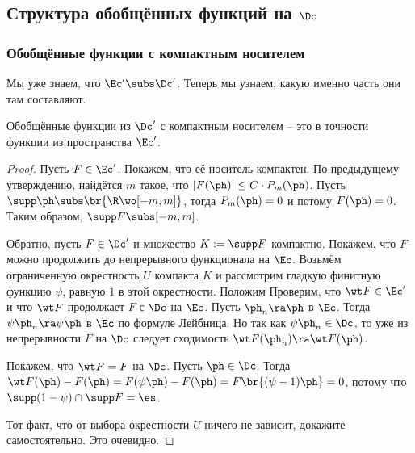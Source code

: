 \documentclass[a4paper]{article}
\begin{document}
\subsection{Структура обобщённых функций на $\Dc$}

\subsubsection{Обобщённые функции с компактным носителем}

Мы уже знаем, что $\Ec' \subs \Dc'$. Теперь мы узнаем, какую именно часть они там составляют.

\begin{theorem}
Обобщённые функции из $\Dc'$ с компактным носителем -- это в точности функции из пространства $\Ec'$.
\end{theorem}
\begin{proof}
Пусть $F \in \Ec'$. Покажем, что её носитель компактен. По предыдущему утверждению,
найдётся $m$ такое, что $|F(\ph)| \le C\cdot P_m(\ph)$. Пусть $\supp\ph \subs \br{\R \wo [-m,m]}$,
тогда $P_m(\ph)=0$ и потому $F(\ph) = 0$. Таким образом, $\supp F \subs [-m,m]$.

Обратно, пусть $F \in \Dc'$ и множество $K := \supp F$ компактно.
Покажем, что $F$ можно продолжить до непрерывного функционала на $\Ec$.
Возьмём ограниченную окрестность $U$ компакта $K$ и рассмотрим гладкую финитную функцию $\psi$,
равную $1$ в этой окрестности. Положим
Проверим, что $\wt F \in \Ec'$ и что $\wt F$ продолжает $F$ с $\Dc$ на $\Ec$.
Пусть $\ph_n \ra \ph$ в $\Ec$. Тогда $\psi\ph_n \ra \psi\ph$ в $\Ec$ по формуле Лейбница.
Но так как $\psi\ph_n \in \Dc$, то уже из непрерывности $F$ на $\Dc$ следует сходимость
$\wt F (\ph_n) \ra \wt F(\ph)$.

Покажем, что $\wt F = F$ на $\Dc$. Пусть $\ph \in \Dc$. Тогда
$\wt F(\ph) - F(\ph) = F(\psi\ph) - F(\ph) = F\br{(\psi-1)\ph} = 0$, потому что
$\supp (1-\psi) \cap \supp F = \es$.

Тот факт, что от выбора окрестности $U$ ничего не зависит, докажите самостоятельно. Это очевидно.
\end{proof}
\end{document}
